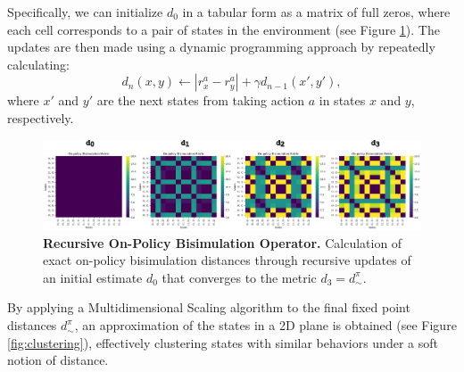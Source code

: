 Specifically, we can initialize \(d_0\) in a tabular form as a matrix of full zeros, where each cell corresponds to a pair of states in the environment (see Figure \ref{fig:iterative_process}). The updates are then made using a dynamic programming approach by repeatedly calculating:
\begin{equation}
    d_n(x,y) \leftarrow |r_x^a - r_y^a| + \gamma d_{n-1}(x',y'),
\end{equation}
where \(x'\) and \(y'\) are the next states from taking action \(a\) in states \(x\) and \(y\), respectively.

\begin{figure}[h]
    \centering
    \includegraphics[width=1.\linewidth]{Figures/iterative process.jpg}
    \caption[Recursive On-policy Bisimulation Operator]{\textbf{Recursive On-Policy Bisimulation Operator.} Calculation of exact on-policy bisimulation distances through recursive updates of an initial estimate \(d_0\) that converges to the metric \(d_3 = d_\sim^\pi\).}
    \label{fig:iterative_process}
\end{figure}

By applying a Multidimensional Scaling algorithm to the final fixed point distances \(d^\pi_\sim\), an approximation of the states in a 2D plane is obtained (see Figure \ref{fig:clustering}), effectively clustering states with similar behaviors under a soft notion of distance. %

